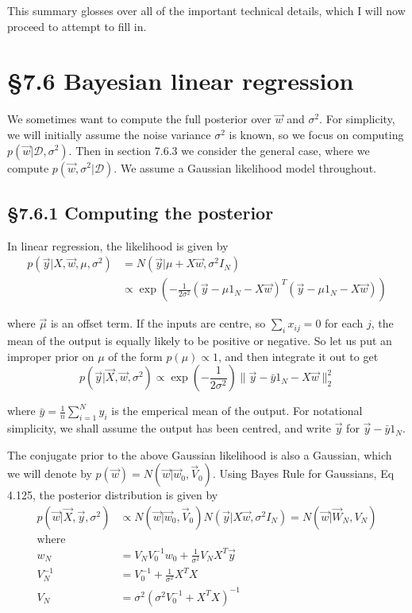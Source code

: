 \documentclass{amsart}
\begin{document}
This summary glosses over all of the important technical details, which I will now
proceed to attempt to fill in.

\section{\S 7.6 Bayesian linear regression}

We sometimes want to compute the full posterior over $\vec{w}$ and $\sigma^2$. For
simplicity, we will initially assume the noise variance $\sigma^2$ is known, so we
focus on computing $p(\vec{w}|\mathcal{D}, \sigma^2)$. Then in section 7.6.3 we
consider the general case, where we compute $p(\vec{w}, \sigma^2|\mathcal{D})$. We assume
a Gaussian likelihood model throughout.

\subsection{\S 7.6.1 Computing the posterior}
In linear regression, the likelihood is given by
\begin{align*}
	p(\vec{y}|X, \vec{w}, \mu, \sigma^2) &= N(\vec{y}|\mu+ X \vec{w}, \sigma^2 I_N) \\
	&\propto \exp{\left(- \frac{1}{2 \sigma^2} (\vec{y} - \mu 1_N - X \vec{w})^T (\vec{y} - \mu 1_N - X \vec{w})\right)}
\end{align*}

where $\vec{\mu}$ is an offset term. If the inputs are centre, so $\sum_i x_{ij} = 0$ for
each $j$, the mean of the output is equally likely to be positive or negative. So let us
put an improper prior on $\mu$ of the form $p(\mu) \propto 1$, and then integrate it out
to get
\[
	p(\vec{y}|\vec{X}, \vec{w}, \sigma^2) \propto \exp{(-\frac{1}{2 \sigma^2}) 
		\|\vec{y} - \bar{y} 1_N - X \vec{w}\|^2_2} 
\]

where $\bar{y} = \frac{1}{n} \sum_{i=1}^N y_i$ is the emperical mean of the output. For
notational simplicity, we shall assume the output has been centred, and write $\vec{y}$ for
$\vec{y} - \bar{y} 1_N$.

The conjugate prior to the above Gaussian likelihood is also a Gaussian, which we will
denote by $p(\vec{w}) = N(\vec{w} | \vec{w}_0, \vec{V}_0)$. Using Bayes Rule for Gaussians,
Eq 4.125, the posterior distribution is given by
\begin{align*}
p(\vec{w}|\vec{X}, \vec{y}, \sigma^2) &\propto N(\vec{w}|\vec{w}_0, \vec{V}_0) N(\vec{y}|X \vec{w}, \sigma^2 I_N) = N(\vec{w}|\vec{W}_N, V_N) \\
\text{where}\\
w_N &= V_N V_0^{-1} w_0 + \frac{1}{\sigma^2} V_N X^T \vec{y} \\
V_N^{-1} &= V_0^{-1} + \frac{1}{\sigma^2} X^T X \\
V_N &= \sigma^2 (\sigma^2 V_0^{-1} + X^T X)^{-1} \\
\end{align*}
\end{document}
